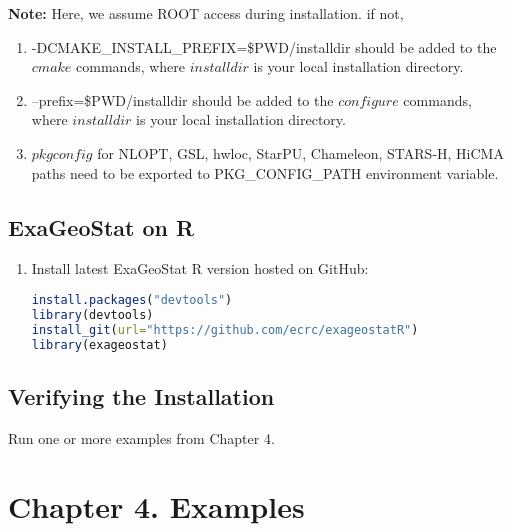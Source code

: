 \documentclass[
10pt, %
a4paper, %
oneside, %
headinclude,footinclude, %
BCOR5mm, %
]{scrartcl}
\begin{document}
\begin{shaded}
{\textbf {Note:}} Here, we assume ROOT access during installation. if not, 
\begin{enumerate}
\item -DCMAKE\_INSTALL\_PREFIX=\$PWD/installdir should be added to the $cmake$ commands, where $installdir$ is your local installation directory.
\item --prefix=\$PWD/installdir should be added to the $configure$ commands, where $installdir$ is your local installation directory.
\item  $pkgconfig$ for NLOPT, GSL, hwloc, StarPU, Chameleon, STARS-H, HiCMA paths need to be exported to PKG\_CONFIG\_PATH environment variable.
\end{enumerate}
\end{shaded}


\subsection{ExaGeoStat on R}
\begin{enumerate}
\item
\noindent Install latest ExaGeoStat R version hosted on GitHub:
\begin{lstlisting}[language=R]
install.packages("devtools")
library(devtools)
install_git(url="https://github.com/ecrc/exageostatR")
library(exageostat)
\end{lstlisting}


\end{enumerate}


\subsection{Verifying the Installation}
Run one or more examples from Chapter 4.


\newpage
\section{Chapter 4. Examples}
\end{document}
